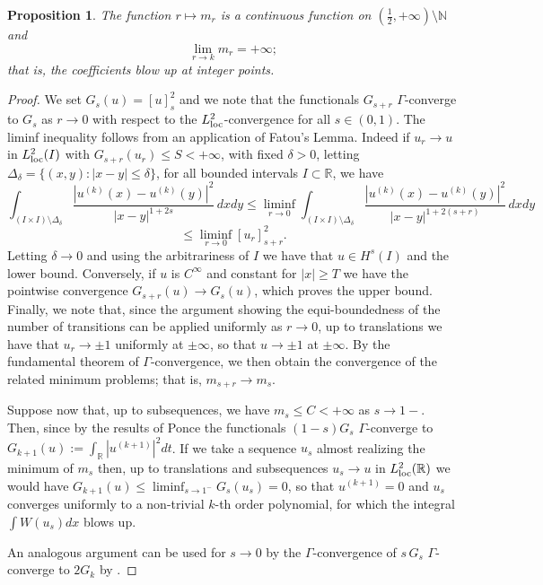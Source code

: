 \documentclass{article}
\newtheorem{proposition}[lemma]{Proposition}
\begin{document}
\begin{proposition}\label{continuityofm1} The function $r\mapsto m_{r}$ is a continuous function on $(\frac12,+\infty)\setminus \mathbb N$ and
\begin{equation}\label{limeks}
\lim_{r\to k} m_{r}=  +\infty;
\end{equation}
that is, the coefficients blow up at integer points.
\end{proposition}

\begin{proof} We set $G_s(u)=[u]^2_s$ and we note that the functionals $G_{s+r}$ $\Gamma$-converge to $G_s$ as $r\to 0$ with respect to the $L^2_{\rm loc}$-convergence for all $s\in(0,1)$. The liminf inequality follows from an application of Fatou's Lemma.
Indeed if $u_r\to u$ in $L^2_{\rm loc}(I)$ with $G_{s+r}(u_r)\le S<+\infty$, with fixed $\delta>0$, letting $\Delta_\delta=\{(x,y): |x-y|\le\delta\}$, for all bounded intervals $I\subset \mathbb R$, we have 
$$
\int_{(I\times I)\setminus \Delta_\delta}\frac{|u^{(k)}(x)- u^{(k)}(y)|^2}{|x-y|^{1+2s}}\,dxdy\le \liminf_{r\to0}\int_{(I\times I)\setminus \Delta_\delta}\frac{|u^{(k)}(x)- u^{(k)}(y)|^2}{|x-y|^{1+2(s+r)}}\,dxdy
$$
$$
\le \liminf_{r\to0}[u_r]^2_{s+r}.
$$
Letting $\delta\to 0$ and using the arbitrariness of $I$ we have that $u\in H^s(I)$ and the lower bound. Conversely, if $u$ is $C^\infty$ and constant for $|x|\ge T$ we have the pointwise convergence $G_{s+r}(u)\to G_s(u)$, which proves the upper bound. 
Finally, we note that, since the argument showing the equi-boundedness of the number of transitions can be applied uniformly as $r\to 0$, up to translations we have that $u_r\to \pm1$ uniformly at $\pm\infty$, so that $u\to\pm1$ at $\pm\infty$. By the fundamental theorem of $\Gamma$-convergence, we then obtain the convergence of the related minimum problems; that is, $m_{s+r}\to m_s$.

Suppose now that, up to subsequences, we have $m_s\le C<+\infty$ as $s\to 1-$.
Then, since by the results of Ponce \cite{ponce} the functionals $(1-s)G_s$ $\Gamma$-converge to $G_{k+1}(u):=\int_\mathbb R |u^{(k+1)}|^2dt$.
If we take a sequence $u_s$ almost realizing the minimum of $m_s$ then, up to translations and subsequences $u_s\to u$ in $L^2_{\rm loc}(\mathbb R)$ we would have $G_{k+1}(u)\le \liminf_{s\to 1^-} G_s(u_s)=0$, so that $u^{(k+1)}=0$ and $u_s$ converges uniformly to a non-trivial $k$-th order polynomial, for which the integral $\int W(u_s)dx$ blows up.

An analogous argument can be used for $s\to 0$ by the $\Gamma$-convergence of $s\,G_s$ $\Gamma$-converge to $2G_{k}$ by \cite{MS}.
\end{proof}
\end{document}
